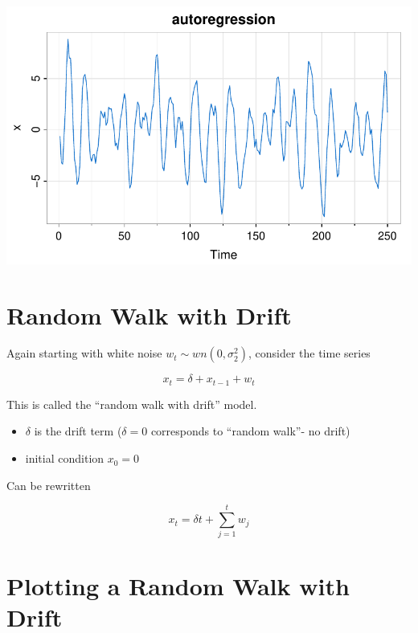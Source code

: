 \documentclass[
  letterpaper,
  DIV=11,
  numbers=noendperiod]{scrreprt}
\begin{document}
\includegraphics{LectureNotes/Lecture1_files/figure-pdf/autoregressions-1.pdf}

\section{Random Walk with Drift}\label{random-walk-with-drift}

Again starting with white noise \(w_t \sim wn(0, \sigma^2_2)\), consider
the time series

\[
x_t = \delta + x_{t-1} + w_t
\]

This is called the ``random walk with drift'' model.

\begin{itemize}
\item
  \(\delta\) is the drift term (\(\delta = 0\) corresponds to ``random
  walk''- no drift)
\item
  initial condition \(x_0 = 0\)
\end{itemize}

Can be rewritten

\[
x_t = \delta t + \sum_{j=1}^t w_j
\]

\section{Plotting a Random Walk with
Drift}\label{plotting-a-random-walk-with-drift}
\end{document}
